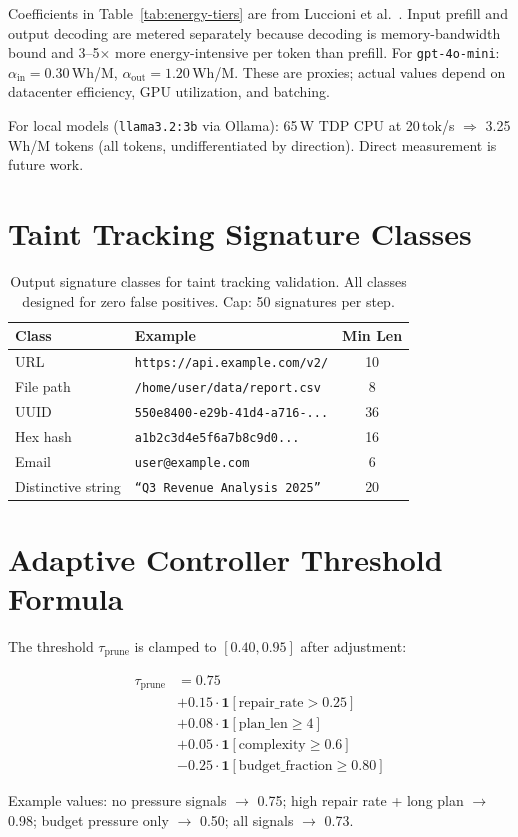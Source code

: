 \documentclass[sigconf,authordraft]{acmart}
\begin{document}
Coefficients in Table~\ref{tab:energy-tiers} are from Luccioni et al.~\cite{luccioni2023power}.
Input prefill and output decoding are metered separately because decoding is memory-bandwidth bound and 3--5$\times$ more energy-intensive per token than prefill.
For \texttt{gpt-4o-mini}: $\alpha_{\text{in}} = 0.30$\,Wh/M, $\alpha_{\text{out}} = 1.20$\,Wh/M.
These are proxies; actual values depend on datacenter efficiency, GPU utilization, and batching.

For local models (\texttt{llama3.2:3b} via Ollama): 65\,W TDP CPU at 20\,tok/s $\Rightarrow$ 3.25 Wh/M tokens (all tokens, undifferentiated by direction).
Direct measurement is future work.

\section{Taint Tracking Signature Classes}
\label{app:taint}

\begin{table}[h]
\centering
\caption{Output signature classes for taint tracking validation. All classes designed for zero false positives. Cap: 50 signatures per step.}
\label{tab:sig-classes}
\begin{tabular}{llc}
\toprule
Class & Example & Min Len \\
\midrule
URL & \texttt{https://api.example.com/v2/} & 10 \\
File path & \texttt{/home/user/data/report.csv} & 8 \\
UUID & \texttt{550e8400-e29b-41d4-a716-...} & 36 \\
Hex hash & \texttt{a1b2c3d4e5f6a7b8c9d0...} & 16 \\
Email & \texttt{user@example.com} & 6 \\
Distinctive string & \texttt{``Q3 Revenue Analysis 2025''} & 20 \\
\bottomrule
\end{tabular}
\end{table}

\section{Adaptive Controller Threshold Formula}
\label{app:adaptive}

The threshold $\tau_{\text{prune}}$ is clamped to $[0.40, 0.95]$ after adjustment:

\begin{align*}
\tau_{\text{prune}} &= 0.75 \\
  &+ 0.15 \cdot \mathbf{1}[\text{repair\_rate} > 0.25] \\
  &+ 0.08 \cdot \mathbf{1}[\text{plan\_len} \geq 4] \\
  &+ 0.05 \cdot \mathbf{1}[\text{complexity} \geq 0.6] \\
  &- 0.25 \cdot \mathbf{1}[\text{budget\_fraction} \geq 0.80]
\end{align*}

Example values: no pressure signals $\to$ 0.75; high repair rate + long plan $\to$ 0.98; budget pressure only $\to$ 0.50; all signals $\to$ 0.73.
\end{document}
